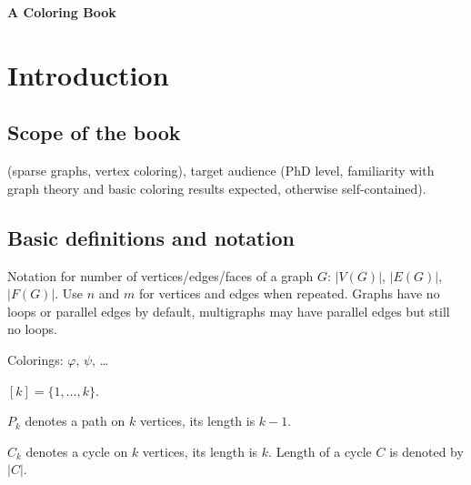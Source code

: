 \documentclass[12pt,twoside,openright,a4paper]{book}
\begin{document}
\pagestyle{empty}
\begin{titlepage}

\begin{center}

\vspace{10cm}

{\large\bf A Coloring Book}

\end{center}
\end{titlepage}

\newpage

\pagestyle{plain}
\tableofcontents

\newpage

\pagestyle{headings}
\setcounter{page}{1}

\chapter*{Introduction}

\section{Scope of the book}

(sparse graphs, vertex coloring), target audience (PhD level,
familiarity with graph theory and basic coloring results expected, otherwise self-contained).

\section{Basic definitions and notation}


Notation for number of vertices/edges/faces of a graph $G$:
$|V(G)|$, $|E(G)|$, $|F(G)|$.  Use $n$ and $m$ for vertices and edges when repeated.
Graphs have no loops or parallel edges by default, multigraphs may have parallel edges but still no loops.

Colorings: $\varphi$, $\psi$, \ldots

$[k]=\{1,\ldots,k\}$.

$P_k$ denotes a path on $k$ vertices, its length is $k-1$.

$C_k$ denotes a cycle on $k$ vertices, its length is $k$.  Length of a cycle $C$ is denoted by $|C|$.
\end{document}
